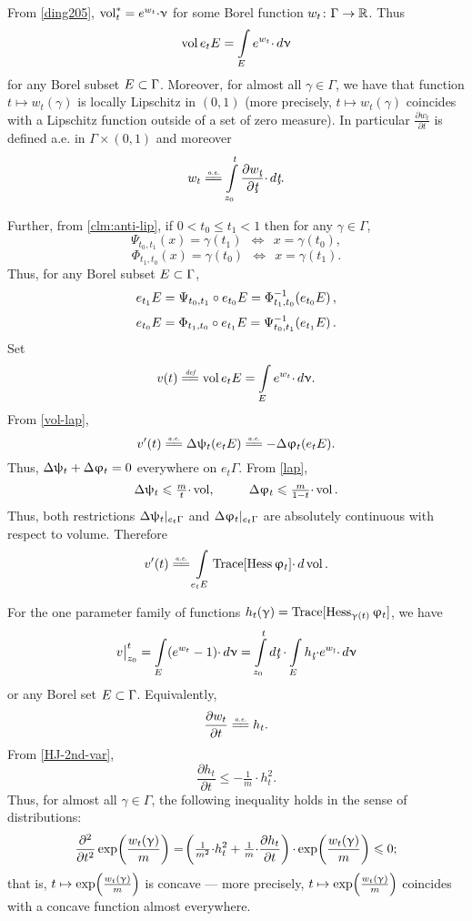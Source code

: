 \documentclass[oneside,a4paper]{article}
\begin{document}
{\sloppy
{}
From \ref{ding205}, $\mathop{\rm vol}\nolimits_t^*=e^{w_t}{\cdot}\upnu$ for some Borel function $w_t\colon\Gamma\to\mathbb{R}$.
Thus
$$\mathop{\rm vol}\nolimits e_t E=\int\limits_{E}e^{w_t}{\cdot}\,d\upnu$$ 
for any Borel subset $E\subset \Gamma$.
Moreover, for almost all $\gamma\in\Gamma$, we have that function $t\mapsto w_t(\gamma)$ is locally Lipschitz in $(0,1)$ (more precisely, $t\mapsto w_t(\gamma)$ coincides with a Lipschitz function outside of a set of zero measure).
In particular $\frac{\partial w_t}{\partial t}$ is defined a.e. in $\Gamma\times (0,1)$
and moreover 
$$w_t
\ae
\int\limits_{z_0}^{t}\frac{\partial w_\under{t}}{\partial \under{t}}{\cdot}\,d\under{t}.$$

}\medskip

Further, from \ref{clm:anti-lip}, if $0<t_0\le t_1<1$ then for any $\gamma\in\Gamma$,
$$\Psi_{t_0,t_1}(x)= \gamma(t_1)\ \ \Longleftrightarrow\ \ x=\gamma({t_0}),$$
$$\Phi_{t_1,t_0}(x)= \gamma({t_0})\ \ \Longleftrightarrow\ \ x=\gamma({t_1}).$$
Thus, for any Borel subset $E\subset \Gamma$,
$$e_{t_1}E=\Psi_{t_0,t_1}\circ e_{t_0}E=\Phi^{-1}_{t_1,t_0}\!\left( e_{t_0}E\right),$$
$$e_{t_0}E=\Phi_{t_1,t_0}\circ  e_{t_1}E=\Psi^{-1}_{t_0,t_1}\!\left(  e_{t_1}E\right).$$
Set 
$$v(t)
\df
\vol e_t E
=
\int\limits_{E}e^{w_t}{\cdot}\,d\nu.$$ 
From \ref{vol-lap},
$$v'(t)
\ae
\Lap\psi_t(e_t E)
\ae
-\Lap\phi_t(e_t E).$$ 
Thus,
$\Delta \uppsi_t+\Delta\upvarphi_t=0$
everywhere on $e_t\Gamma$.
From \ref{lap},
$$\Lap\psi_t\le\tfrac m t{\cdot}\vol,\ \ \ \ \ \ \ \ \Lap\phi_t\le\tfrac m {1-t}{\cdot}\vol.$$
Thus, both restrictions  $\Delta \uppsi_t|_{e_t\Gamma}$ and $\Delta\upvarphi_t|_{e_t\Gamma}$
are absolutely continuous with respect to volume.
Therefore
$$v'(t)
\ae
\int\limits_{e_t E}\Trace[\Hess\phi_t]{\cdot}\,d\vol.
$$

For the one parameter family of functions $h_t(\upgamma)=\text{\rm Trace}[\operatorname{Hess}_{\upgamma(t)}\upvarphi_t]$, we have
$$\bigl.v\bigr|_{z_0}^t
=
\int\limits_E(e^{w_t}-1){\cdot}\,d\nu
=
\int\limits_{z_0}^t d\under{t}\cdot\int\limits_E h_\under{t}{\cdot}e^{w_\under{t}}{\cdot}\,d\nu$$
or any Borel set $E\subset \Gamma$. 
Equivalently, 
$$\frac{\partial w_t}{\partial t}
\ae 
h_t.$$
From \ref{HJ-2nd-var}, 
$$\frac{\partial h_t}{\partial t}\le -\tfrac1m{\cdot} h_t^2.$$
Thus, for almost all $\gamma\in\Gamma$, the following inequality holds in the sense of distributions:
$$\frac{\partial^2}{\partial t^2}\exp\!\left(\frac{w_t(\upgamma)}m\right)
=
\!\left(\tfrac1{m^2}{\cdot}{h_t^2}+\tfrac1{m}{\cdot}\frac{\partial h_t}{\partial t}\right){\cdot}\exp\!\left(\frac{w_t(\upgamma)}m\right)\leqslant 0;
$$ 
that is, $t\mapsto \exp\!\left(\frac{w_t(\upgamma)}m\right)$ is concave
--- more precisely, $t\mapsto \exp\!\left(\frac{w_t(\upgamma)}m\right)$ coincides with a concave function almost everywhere.
\end{document}
